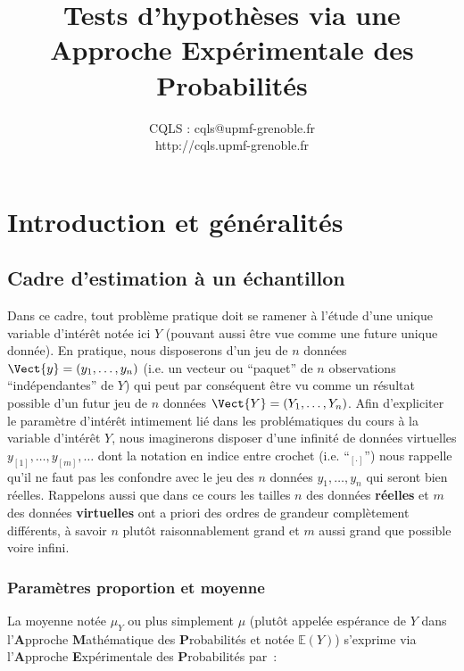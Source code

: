 \documentclass[10pt]{article}
\title{Tests d'hypoth{\`e}ses via une \textbf{A}pproche \textbf{E}xp{\'e}rimentale des \textbf{P}robabilités}
\author{CQLS : cqls@upmf-grenoble.fr \\ http://cqls.upmf-grenoble.fr}
\date{ }
\begin{document}
\maketitle


\section{Introduction et g{\'e}n{\'e}ralit{\'e}s} \label{introGen}

\subsection{Cadre d'estimation à un échantillon}
Dans ce cadre, tout probl{\`e}me pratique doit se ramener {\`a} l'{\'e}tude d'une unique variable d'int{\'e}r{\^e}t not{\'e}e ici $Y$ (pouvant aussi {\^e}tre vue comme une future unique donn{\'e}e). %
En pratique, nous disposerons d'un jeu de $n$ donn{\'e}es $\Vect{y}=(y_1,\ldots,y_n)$ (i.e. un vecteur ou ``paquet'' de $n$ observations ``ind{\'e}pendantes'' de $Y$) qui peut par cons{\'e}quent {\^e}tre vu comme un r{\'e}sultat possible d'un futur jeu de $n$ donn{\'e}es $\Vect{Y}=(Y_1,\ldots,Y_n)$. Afin d'expliciter le param{\`e}tre d'int{\'e}r{\^e}t intimement li{\'e} dans les probl{\'e}matiques du cours {\`a} la variable d'int{\'e}r{\^e}t $Y$, nous imaginerons disposer d'une infinit{\'e} de donn{\'e}es virtuelles $y_{[1]},\ldots,y_{[m]},\ldots$ dont la notation en indice entre crochet (i.e. ``$_{[\cdot]}$'') nous rappelle qu'il ne faut pas les confondre avec le jeu des $n$ donn{\'e}es $y_1,\ldots,y_n$ qui seront bien r{\'e}elles. Rappelons aussi que dans ce cours les tailles $n$ des donn{\'e}es \textbf{r{\'e}elles} et $m$ des donn{\'e}es \textbf{virtuelles} ont a priori des ordres de grandeur compl{\`e}tement diff{\'e}rents, {\`a} savoir $n$ plut{\^o}t raisonnablement grand  et $m$ aussi grand que possible voire infini.%
\subsubsection{Paramètres proportion et moyenne}
 La moyenne not{\'e}e $\mu_Y$ ou plus simplement $\mu$ (plut{\^o}t appel{\'e}e esp{\'e}rance de $Y$ dans l'\textbf{A}pproche \textbf{M}athématique des \textbf{P}robabilités et not{\'e}e $\mathbb{E}(Y)$) s'exprime via l'\textbf{A}pproche \textbf{E}xpérimentale des \textbf{P}robabilités par~:\\
\centerline{}
\end{document}
